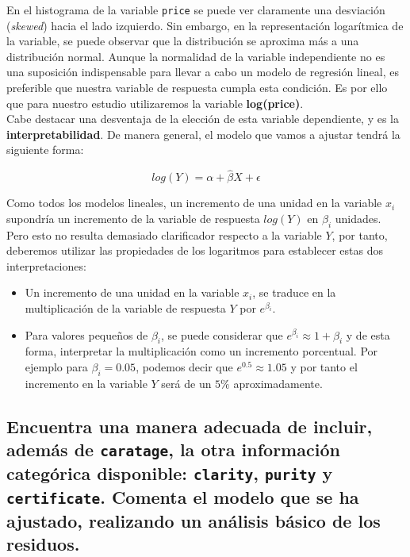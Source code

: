 \documentclass[a4paper, 7pt]{article}
\begin{document}
En el histograma de la variable \texttt{price} se puede ver claramente una desviación (\textit{skewed}) hacia el lado izquierdo. Sin embargo, en la representación logarítmica de la variable, se puede observar que la distribución se aproxima más a una distribución normal. Aunque la normalidad de la variable independiente no es una suposición indispensable para llevar a cabo un modelo de regresión lineal, es preferible que nuestra variable de respuesta cumpla esta condición. Es por ello que para nuestro estudio utilizaremos la variable \textbf{log(price)}. \\

Cabe destacar una desventaja de la elección de esta variable dependiente, y es la \textbf{interpretabilidad}. De manera general, el modelo que vamos a ajustar tendrá la siguiente forma:

\begin{equation}
    log(Y) = \alpha + \widehat{\beta}X + \epsilon
\end{equation}

Como todos los modelos lineales, un incremento de una unidad en la variable $x_i$ supondría un incremento de la variable de respuesta $log(Y)$ en $\beta_i$ unidades. Pero esto no resulta demasiado clarificador respecto a la variable $Y$, por tanto, deberemos utilizar las propiedades de los logaritmos para establecer estas dos interpretaciones:

\begin{itemize}
    \item Un incremento de una unidad en la variable $x_i$, se traduce en la multiplicación de la variable de respuesta $Y$ por $e^{\beta_i}$.
    \item Para valores pequeños de $\beta_i$, se puede considerar que $e^{\beta_i} \approx 1 + \beta_i$ y de esta forma, interpretar la multiplicación como un incremento porcentual. Por ejemplo para $\beta_i = 0.05$, podemos decir que $e^{0.5} \approx 1.05$ y por tanto el incremento en la variable $Y$ será de un $5\%$ aproximadamente.
\end{itemize}

\subsection{Encuentra una manera adecuada de incluir, además de \texttt{caratage}, la otra información categórica disponible: \texttt{clarity}, \texttt{purity} y \texttt{certificate}. Comenta el modelo que se ha ajustado, realizando un análisis básico de los residuos.}
\label{subsec:question-2}
\end{document}
